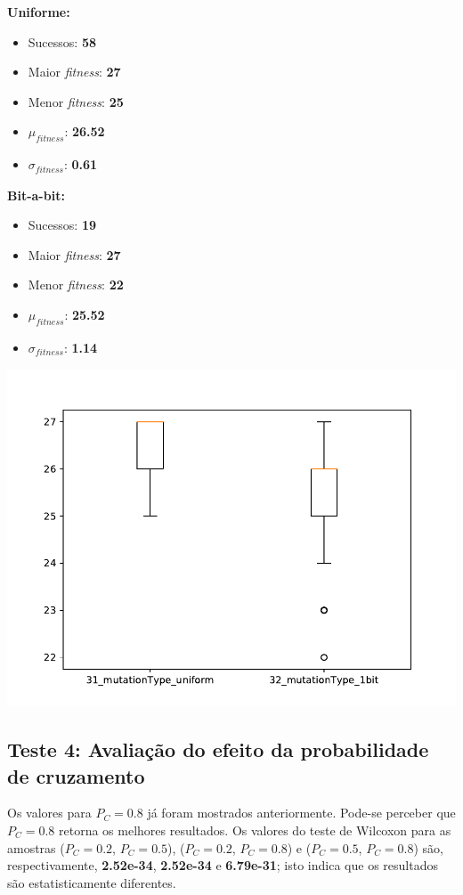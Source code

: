 \documentclass[11pt,a4paper]{article}
\begin{document}
\begin{minipage}{0.25\linewidth}
\textbf{Uniforme:}
\begin{itemize}
	\footnotesize
	\setlength\itemsep{0em}
	\item Sucessos: \textbf{58}
	\item Maior \textit{fitness}: \textbf{27}
	\item Menor \textit{fitness}: \textbf{25}
	\item $\mu_{\textit{fitness}}$: \textbf{26.52}
	\item $\sigma_{\textit{fitness}}$: \textbf{0.61}
\end{itemize}
\end{minipage}
\begin{minipage}{0.25\linewidth}
\textbf{Bit-a-bit:}
\begin{itemize}
	\footnotesize
	\setlength\itemsep{0em}
	\item Sucessos: \textbf{19}
	\item Maior \textit{fitness}: \textbf{27}
	\item Menor \textit{fitness}: \textbf{22}
	\item $\mu_{\textit{fitness}}$: \textbf{25.52}
	\item $\sigma_{\textit{fitness}}$: \textbf{1.14}
\end{itemize}
\end{minipage}
\begin{minipage}{0.5\linewidth}
\includegraphics[scale=0.48]{teste3.pdf} 
\end{minipage}

\subsection{Teste 4: Avaliação do efeito da probabilidade de cruzamento}
Os valores para $P_C=0.8$ já foram mostrados anteriormente. Pode-se perceber que $P_C=0.8$ retorna os melhores resultados. Os valores do teste de Wilcoxon para as amostras ($P_C=0.2$, $P_C=0.5$), ($P_C=0.2$, $P_C=0.8$) e ($P_C=0.5$, $P_C=0.8$) são, respectivamente, \textbf{2.52e-34}, \textbf{2.52e-34} e \textbf{6.79e-31}; isto indica que os resultados são estatisticamente diferentes.\\
\end{document}
